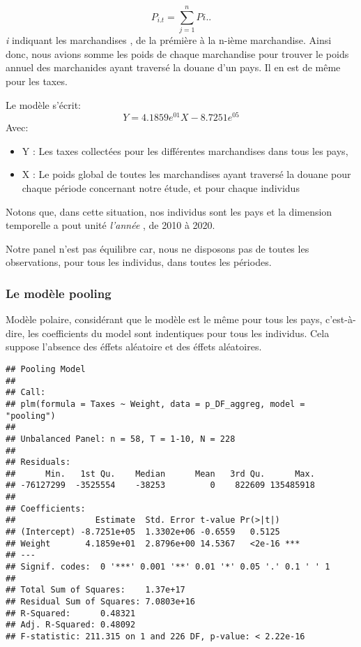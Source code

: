 \documentclass[
]{book}
\providecommand{\tightlist}{%
  \setlength{\itemsep}{0pt}\setlength{\parskip}{0pt}}
\begin{document}
\[ P_{i.t}=\sum_{j=1}^{n} P{i..} \]
\emph{i} indiquant les marchandises , de la prémière à la n-ième marchandise. Ainsi donc, nous avions somme les poids de chaque marchandise pour trouver le poids annuel des marchanides ayant traversé la douane d'un pays. Il en est de même pour les taxes.

Le modèle s'écrit:
\[Y= 4.1859e^{01} X - 8.7251e^{05}  \]
Avec:

\begin{itemize}
\tightlist
\item
  Y : Les taxes collectées pour les différentes marchandises dans tous les pays,
\item
  X : Le poids global de toutes les marchandises ayant traversé la douane pour chaque période concernant notre étude, et pour chaque individus
\end{itemize}

Notons que, dans cette situation, nos individus sont les pays et la dimension temporelle a pout unité \emph{l'année} , de 2010 à 2020.

Notre panel n'est pas équilibre car, nous ne disposons pas de toutes les observations, pour tous les individus, dans toutes les périodes.

\hypertarget{le-moduxe8le-pooling}{%
\subsubsection{Le modèle pooling}\label{le-moduxe8le-pooling}}

Modèle polaire, considérant que le modèle est le même pour tous les pays, c'est-à-dire, les coefficients du model sont indentiques pour tous les individus. Cela suppose l'absence des éffets aléatoire et des éffets aléatoires.

\begin{verbatim}
## Pooling Model
## 
## Call:
## plm(formula = Taxes ~ Weight, data = p_DF_aggreg, model = "pooling")
## 
## Unbalanced Panel: n = 58, T = 1-10, N = 228
## 
## Residuals:
##      Min.   1st Qu.    Median      Mean   3rd Qu.      Max. 
## -76127299  -3525554    -38253         0    822609 135485918 
## 
## Coefficients:
##                Estimate  Std. Error t-value Pr(>|t|)    
## (Intercept) -8.7251e+05  1.3302e+06 -0.6559   0.5125    
## Weight       4.1859e+01  2.8796e+00 14.5367   <2e-16 ***
## ---
## Signif. codes:  0 '***' 0.001 '**' 0.01 '*' 0.05 '.' 0.1 ' ' 1
## 
## Total Sum of Squares:    1.37e+17
## Residual Sum of Squares: 7.0803e+16
## R-Squared:      0.48321
## Adj. R-Squared: 0.48092
## F-statistic: 211.315 on 1 and 226 DF, p-value: < 2.22e-16
\end{verbatim}
\end{document}
